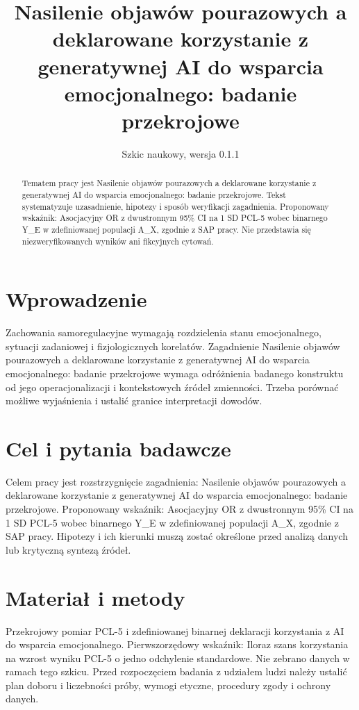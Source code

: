 \documentclass[11pt,a4paper]{article}
\title{Nasilenie objawów pourazowych a deklarowane korzystanie z generatywnej AI do wsparcia emocjonalnego: badanie przekrojowe}
\author{}
\date{Szkic naukowy, wersja 0.1.1}
\begin{document}
\maketitle

\begin{abstract}

Tematem pracy jest Nasilenie objawów pourazowych a deklarowane korzystanie z generatywnej AI do wsparcia emocjonalnego: badanie przekrojowe. Tekst systematyzuje uzasadnienie, hipotezy i sposób weryfikacji zagadnienia. Proponowany wskaźnik: Asocjacyjny OR z dwustronnym 95\% CI na 1 SD PCL-5 wobec binarnego Y\_E w zdefiniowanej populacji A\_X, zgodnie z SAP pracy. Nie przedstawia się niezweryfikowanych wyników ani fikcyjnych cytowań.

\end{abstract}

\section{Wprowadzenie}

Zachowania samoregulacyjne wymagają rozdzielenia stanu emocjonalnego, sytuacji zadaniowej i fizjologicznych korelatów. Zagadnienie Nasilenie objawów pourazowych a deklarowane korzystanie z generatywnej AI do wsparcia emocjonalnego: badanie przekrojowe wymaga odróżnienia badanego konstruktu od jego operacjonalizacji i kontekstowych źródeł zmienności. Trzeba porównać możliwe wyjaśnienia i ustalić granice interpretacji dowodów.

\section{Cel i pytania badawcze}

Celem pracy jest rozstrzygnięcie zagadnienia: Nasilenie objawów pourazowych a deklarowane korzystanie z generatywnej AI do wsparcia emocjonalnego: badanie przekrojowe. Proponowany wskaźnik: Asocjacyjny OR z dwustronnym 95\% CI na 1 SD PCL-5 wobec binarnego Y\_E w zdefiniowanej populacji A\_X, zgodnie z SAP pracy. Hipotezy i ich kierunki muszą zostać określone przed analizą danych lub krytyczną syntezą źródeł.

\section{Materiał i metody}

Przekrojowy pomiar PCL-5 i zdefiniowanej binarnej deklaracji korzystania z AI do wsparcia emocjonalnego. Pierwszorzędowy wskaźnik: Iloraz szans korzystania na wzrost wyniku PCL-5 o jedno odchylenie standardowe. Nie zebrano danych w ramach tego szkicu. Przed rozpoczęciem badania z udziałem ludzi należy ustalić plan doboru i liczebności próby, wymogi etyczne, procedury zgody i ochrony danych.
\end{document}
